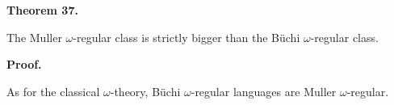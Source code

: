 \documentclass[10pt,a4paper]{article}
\begin{document}
 
 
\par\medskip\noindent\textbf{Theorem 37.}\par
 
 
The Muller $\omega$-regular class is strictly bigger than the Büchi $\omega$-regular class.\par
 
 
 
 
\par\medskip\noindent\textbf{Proof.}\par
 
 
As for the classical $\omega$-theory, Büchi $\omega$-regular languages are Muller $\omega$-regular.\par
 
 
 
\end{document}
